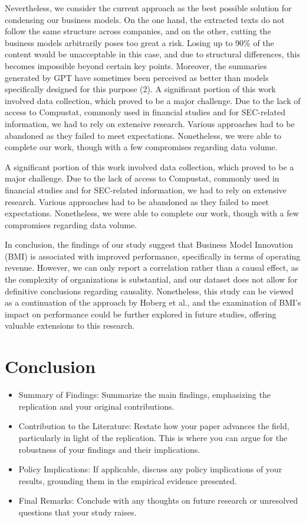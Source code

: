 \documentclass[
]{article}
\providecommand{\tightlist}{%
  \setlength{\itemsep}{0pt}\setlength{\parskip}{0pt}}\usepackage{longtable,booktabs,array}
\begin{document}
Nevertheless, we consider the current approach as the best possible
solution for condensing our business models. On the one hand, the
extracted texts do not follow the same structure across companies, and
on the other, cutting the business models arbitrarily poses too great a
risk. Losing up to 90\% of the content would be unacceptable in this
case, and due to structural differences, this becomes impossible beyond
certain key points. Moreover, the summaries generated by GPT have
sometimes been perceived as better than models specifically designed for
this purpose (2). A significant portion of this work involved data
collection, which proved to be a major challenge. Due to the lack of
access to Compustat, commonly used in financial studies and for
SEC-related information, we had to rely on extensive research. Various
approaches had to be abandoned as they failed to meet expectations.
Nonetheless, we were able to complete our work, though with a few
compromises regarding data volume.

A significant portion of this work involved data collection, which
proved to be a major challenge. Due to the lack of access to Compustat,
commonly used in financial studies and for SEC-related information, we
had to rely on extensive research. Various approaches had to be
abandoned as they failed to meet expectations. Nonetheless, we were able
to complete our work, though with a few compromises regarding data
volume.

In conclusion, the findings of our study suggest that Business Model
Innovation (BMI) is associated with improved performance, specifically
in terms of operating revenue. However, we can only report a correlation
rather than a causal effect, as the complexity of organizations is
substantial, and our dataset does not allow for definitive conclusions
regarding causality. Nonetheless, this study can be viewed as a
continuation of the approach by Hoberg et al., and the examination of
BMI's impact on performance could be further explored in future studies,
offering valuable extensions to this research.

\section{Conclusion}\label{conclusion}

\begin{itemize}
\tightlist
\item
  Summary of Findings: Summarize the main findings, emphasizing the
  replication and your original contributions.
\item
  Contribution to the Literature: Restate how your paper advances the
  field, particularly in light of the replication. This is where you can
  argue for the robustness of your findings and their implications.
\item
  Policy Implications: If applicable, discuss any policy implications of
  your results, grounding them in the empirical evidence presented.
\item
  Final Remarks: Conclude with any thoughts on future research or
  unresolved questions that your study raises.
\end{itemize}
\end{document}

